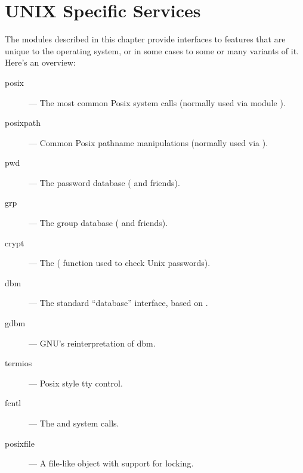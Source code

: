 \chapter{UNIX Specific Services}

The modules described in this chapter provide interfaces to features
that are unique to the \UNIX{} operating system, or in some cases to
some or many variants of it.  Here's an overview:

\begin{description}

\item[posix]
--- The most common Posix system calls (normally used via module ).

\item[posixpath]
--- Common Posix pathname manipulations (normally used via ).

\item[pwd]
--- The password database ( and friends).

\item[grp]
--- The group database ( and friends).

\item[crypt]
--- The ( function used to check Unix passwords).

\item[dbm]
--- The standard ``database'' interface, based on .

\item[gdbm]
--- GNU's reinterpretation of dbm.

\item[termios]
--- Posix style tty control.

\item[fcntl]
--- The  and  system calls.

\item[posixfile]
--- A file-like object with support for locking.

\end{description}
